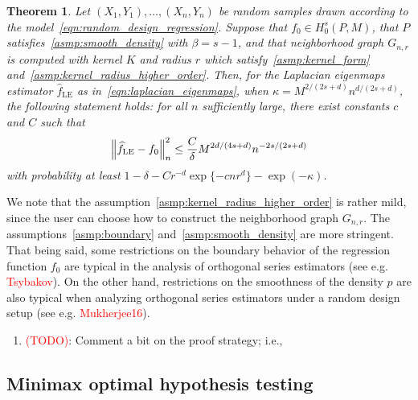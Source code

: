\documentclass{article}
\newcommand{\1}{\mathbf{1}}
\newcommand{\wh}[1]{\widehat{#1}}
\newcommand{\LE}{\mathrm{LE}}
\theoremstyle{alden}
\theoremstyle{aldenthm}
\newtheorem{theorem}{Theorem}
\theoremstyle{definition}
\theoremstyle{remark}
\begin{document}
\begin{theorem}
	\label{thm:laplacian_eigenmaps_estimation}
	Let $(X_1,Y_1),\ldots,(X_n,Y_n)$ be random samples drawn according to the model~\eqref{eqn:random_design_regression}. Suppose that $f_0 \in H_0^s(P,M)$, that $P$ satisfies~\ref{asmp:smooth_density} with $\beta = s - 1$, and that neighborhood graph $G_{n,r}$ is computed with kernel $K$ and radius $r$ which satisfy~\ref{asmp:kernel_form} and~\ref{asmp:kernel_radius_higher_order}. Then, for the Laplacian eigenmaps estimator $\wh{f}_{\LE}$ as in~\eqref{eqn:laplacian_eigenmaps}, when $\kappa = M^{2/(2s + d)}n^{d/(2s + d)}$, the following statement holds: for all $n$ sufficiently large, there exist constants $c$ and $C$ such that
	\begin{equation*}
	\Bigl\|\wh{f}_{\LE} - f_0\Bigr\|_n^2 \leq \frac{C}{\delta} M^{2d/(4s + d)} n^{-2s/(2s + d)}
	\end{equation*}
	with probability at least $1 - \delta -  Cr^{-d}\exp\{-cnr^d\} - \exp(-\kappa)$.
\end{theorem}

We note that the assumption~\ref{asmp:kernel_radius_higher_order} is rather mild, since the user can choose how to construct the neighborhood graph $G_{n,r}$. The assumptions~\ref{asmp:boundary} and~\ref{asmp:smooth_density} are more stringent. That being said, some restrictions on the boundary behavior of the regression function $f_0$ are typical in the analysis of orthogonal series estimators (see e.g. \textcolor{red}{Tsybakov}). On the other hand, restrictions on the smoothness of the density $p$ are also typical when analyzing orthogonal series estimators under a random design setup (see e.g. \textcolor{red}{Mukherjee16}).

\begin{enumerate}
	\item \textcolor{red}{(TODO)}: Comment a bit on the proof strategy; i.e., 
\end{enumerate}

\subsection{Minimax optimal hypothesis testing}
\label{subsec:minimax_testing_higher_order}
\end{document}
